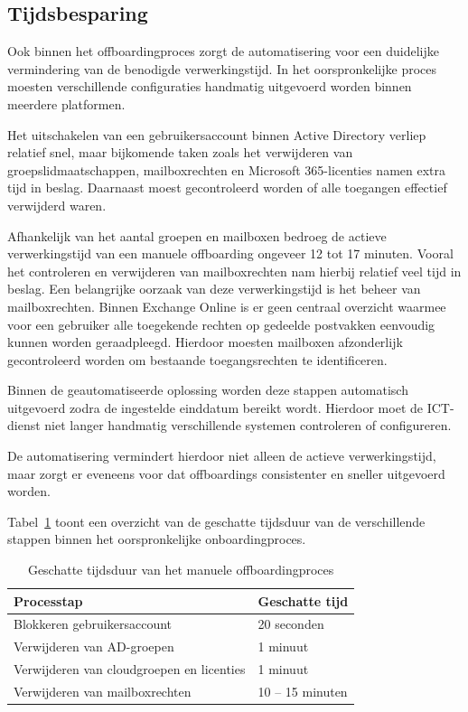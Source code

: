 \subsection{Tijdsbesparing}

Ook binnen het offboardingproces zorgt de automatisering voor een duidelijke vermindering van de benodigde verwerkingstijd. In het oorspronkelijke proces moes\-ten verschillende configuraties handmatig uitgevoerd worden binnen meerdere platformen.

Het uitschakelen van een gebruikersaccount binnen Active Directory verliep relatief snel, maar bijkomende taken zoals het verwijderen van groepslidmaatschappen, mailboxrechten en Microsoft 365-licenties namen extra tijd in beslag. Daarnaast moest gecontroleerd worden of alle toegangen effectief verwijderd waren.

Afhankelijk van het aantal groepen en mailboxen bedroeg de actieve verwerkingstijd van een manuele offboarding ongeveer 12 tot 17 minuten. Vooral het controleren en verwijderen van mailboxrechten nam hierbij relatief veel tijd in beslag. Een belangrijke oorzaak van deze verwerkingstijd is het beheer van mailboxrechten. Binnen Exchange Online is er geen centraal overzicht waarmee voor een gebruiker alle toegekende rechten op gedeelde postvakken eenvoudig kunnen worden geraadpleegd. Hierdoor moesten mailboxen afzonderlijk gecontroleerd worden om bestaande toegangsrechten te identificeren.

Binnen de geautomatiseerde oplossing worden deze stappen automatisch uitgevoerd zodra de ingestelde einddatum bereikt wordt. Hierdoor moet de ICT-dienst niet langer handmatig verschillende systemen controleren of configureren.

De automatisering vermindert hierdoor niet alleen de actieve verwerkingstijd, maar zorgt er eveneens voor dat offboardings consistenter en sneller uitgevoerd worden.

Tabel~\ref{tab:TijdsvergelijkingOffboarding} toont een overzicht van de geschatte tijdsduur van de verschillende stappen binnen het oorspronkelijke onboardingproces.

\begin{table}[htbp]
    \centering    
    \begin{tabular}{|p{8cm}|p{4cm}|}
        \hline
        \textbf{Processtap} & \textbf{Geschatte tijd} \\
        \hline
        
        Blokkeren gebruikersaccount & 20 seconden \\
        \hline
        
        Verwijderen van AD-groepen & 1 minuut \\
        \hline
        
        Verwijderen van cloudgroepen en licenties & 1 minuut \\
        \hline
        
        Verwijderen van mailboxrechten & 10 -- 15 minuten \\
        \hline
    \end{tabular}
    \caption{Geschatte tijdsduur van het manuele offboardingproces}
    \label{tab:TijdsvergelijkingOffboarding}
\end{table}

